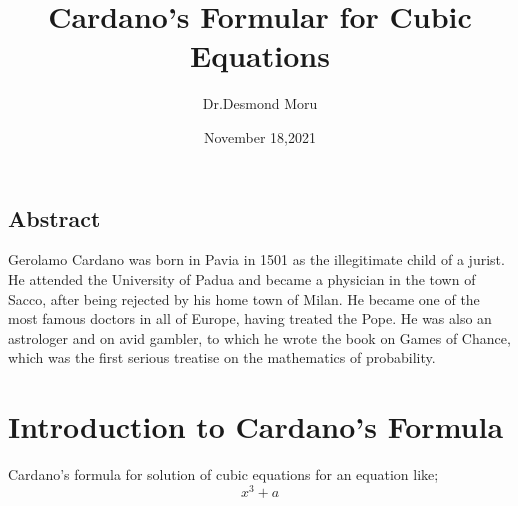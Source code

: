 \documentclass{article}
\title{Cardano's Formular for Cubic Equations}
\date{November 18,2021}
\author{Dr.Desmond Moru}
\begin{document}
	\maketitle
\begin{center}
	\section*{Abstract}
	Gerolamo Cardano was born in Pavia in 1501 as the illegitimate child of a jurist. He attended the University of Padua and became a physician in the town of Sacco, after being rejected by his home town of Milan. He became one of the most famous doctors in all of Europe, having treated the Pope. He was also an astrologer and on avid gambler, to which he wrote the book on Games of Chance, which was the first serious treatise on the mathematics of probability.\end{center}
\section{Introduction to Cardano's Formula}
Cardano's formula for solution of cubic equations for an equation like;\begin{equation*}	x^3 + a
 \end{equation*}
\end{document}
